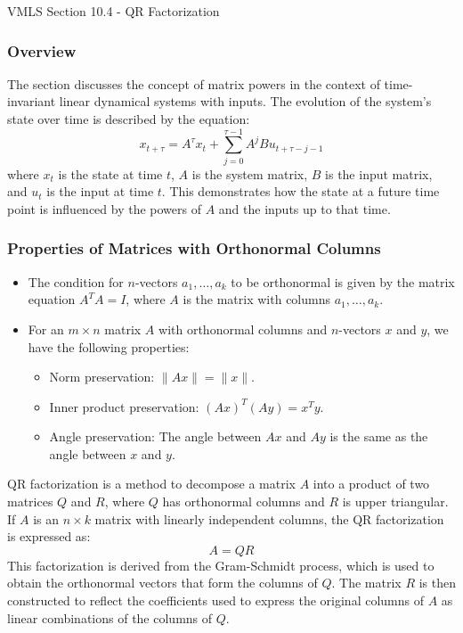 \begin{notes}{VMLS Section 10.4 - QR Factorization}
    \subsubsection*{Overview}

    \begin{Highlight}
        The section discusses the concept of matrix powers in the context of time-invariant linear dynamical systems with inputs. The evolution of the system's state over time is described by the equation:
        \begin{equation*}
            x_{t+\tau} = A^\tau x_t + \sum_{j=0}^{\tau-1} A^j B u_{t+\tau-j-1}
        \end{equation*}
        where $x_t$ is the state at time $t$, $A$ is the system matrix, $B$ is the input matrix, and $u_t$ is the input at time $t$. This demonstrates how the state at a future time point is influenced 
        by the powers of $A$ and the inputs up to that time.
    \end{Highlight}

    
    \subsubsection*{Properties of Matrices with Orthonormal Columns}
    \begin{itemize}
        \item The condition for $n$-vectors $a_1, \ldots, a_k$ to be orthonormal is given by the matrix equation $A^T A = I$, where $A$ is the matrix with columns $a_1, \ldots, a_k$.
        \item For an $m \times n$ matrix $A$ with orthonormal columns and $n$-vectors $x$ and $y$, we have the following properties:
        \begin{itemize}
        \item Norm preservation: $\| Ax \| = \| x \|$.
        \item Inner product preservation: $(Ax)^T (Ay) = x^T y$.
        \item Angle preservation: The angle between $Ax$ and $Ay$ is the same as the angle between $x$ and $y$.
        \end{itemize}
    \end{itemize}

    \begin{Highlight}[QR Factorization]
        QR factorization is a method to decompose a matrix $A$ into a product of two matrices $Q$ and $R$, where $Q$ has orthonormal columns and $R$ is upper triangular. If $A$ is an $n \times k$ matrix 
        with linearly independent columns, the QR factorization is expressed as:
        \begin{equation*}
            A = QR
        \end{equation*}
        This factorization is derived from the Gram-Schmidt process, which is used to obtain the orthonormal vectors that form the columns of $Q$. The matrix $R$ is then constructed to reflect the 
        coefficients used to express the original columns of $A$ as linear combinations of the columns of $Q$.
    \end{Highlight}
    

\end{notes}
